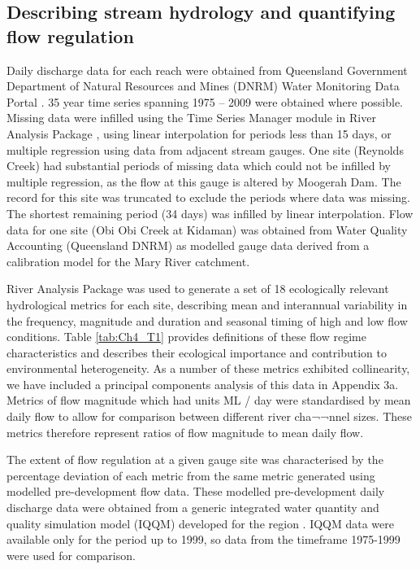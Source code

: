 \documentclass[openright,12pt,a4paper]{memoir}
\begin{document}
\subsection{Describing stream hydrology and quantifying flow regulation}
Daily discharge data for each reach were obtained from Queensland Government Department of Natural Resources and Mines (DNRM) Water Monitoring Data Portal . 35 year time series spanning 1975 – 2009 were obtained where possible. Missing data were infilled using the Time Series Manager module in River Analysis Package \citep{marsh2003river}, using linear interpolation for periods less than 15 days, or multiple regression using data from adjacent stream gauges. One site (Reynolds Creek) had substantial periods of missing data which could not be infilled by multiple regression, as the flow at this gauge is altered by Moogerah Dam. The record for this site was truncated to exclude the periods where data was missing. The shortest remaining period (34 days) was infilled by linear interpolation. Flow data for one site (Obi Obi Creek at Kidaman) was obtained from Water Quality Accounting (Queensland DNRM) as modelled gauge data derived from a calibration model for the Mary River catchment.

River Analysis Package was used to generate a set of 18 ecologically relevant hydrological metrics for each site, describing mean and interannual variability in the frequency, magnitude and duration and seasonal timing of high and low flow conditions. Table \ref{tab:Ch4_T1} provides definitions of these flow regime characteristics and describes their ecological importance and contribution to environmental heterogeneity. As a number of these metrics exhibited collinearity, we have included a principal components analysis of this data in Appendix 3a. Metrics of flow magnitude which had units ML / day were standardised by mean daily flow to allow for comparison between different river cha¬¬nnel sizes. These metrics therefore represent ratios of flow magnitude to mean daily flow.

The extent of flow regulation at a given gauge site was characterised by the percentage deviation of each metric from the same metric generated using modelled pre-development flow data. These modelled pre-development daily discharge data were obtained from a generic integrated water quantity and quality simulation model (IQQM) developed for the region \citep{simons1996iqqm}. IQQM data were available only for the period up to 1999, so data from the timeframe 1975-1999 were used for comparison.
\end{document}
